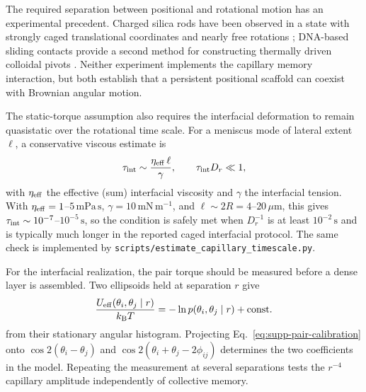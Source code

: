 \documentclass[aps,prl,onecolumn,superscriptaddress,nofootinbib]{revtex4-2}
\begin{document}
The required separation between positional and rotational motion has an
experimental precedent.  Charged silica rods have been observed in a state
with strongly caged translational coordinates and nearly free rotations
\cite{besseling2026}; DNA-based sliding contacts provide a second method for
constructing thermally driven colloidal pivots \cite{melio2026}.  Neither
experiment implements the capillary memory interaction, but both establish
that a persistent positional scaffold can coexist with Brownian angular
motion.

The static-torque assumption also requires the interfacial
deformation to remain quasistatic over the rotational time scale.
For a meniscus mode of lateral extent \(\ell\), a conservative viscous estimate is
\[
 \tau_{\rm int} \sim \frac{\eta_{\rm eff}\,\ell}{\gamma},
\qquad
 \tau_{\rm int}D_r \ll 1,
\]
with \(\eta_{\rm eff}\) the effective (sum) interfacial viscosity and \(\gamma\) the
interfacial tension.  With \(\eta_{\rm eff}=1\)--\(5\,\mathrm{mPa\,s}\),
\(\gamma=10\,\mathrm{mN\,m^{-1}}\), and \(\ell\sim 2R=4\)--\(20\,\mu\mathrm m\),
this gives \(\tau_{\rm int}\sim10^{-7}\)--\(10^{-5}\,\mathrm s\), so the condition is
safely met when \(D_r^{-1}\) is at least \(10^{-2}\,\mathrm s\) and is typically
much longer in the reported caged interfacial protocol.
The same check is implemented by
\texttt{scripts/estimate\_capillary\_timescale.py}.

For the interfacial realization, the pair torque should be measured before a
dense layer is assembled.  Two ellipsoids held at separation \(r\) give
\begin{equation}
 \frac{U_{\rm eff}(\theta_i,\theta_j\mid r)}{k_{\rm B}T}
 =-\ln p(\theta_i,\theta_j\mid r)+\mathrm{const.}
 \label{eq:supp-pair-calibration}
\end{equation}
from their stationary angular histogram.  Projecting
Eq.~\eqref{eq:supp-pair-calibration} onto
\(\cos2(\theta_i-\theta_j)\) and
\(\cos2(\theta_i+\theta_j-2\phi_{ij})\) determines the two coefficients in
the model.  Repeating the measurement at several separations tests the
\(r^{-4}\) capillary amplitude independently of collective memory.
\end{document}
